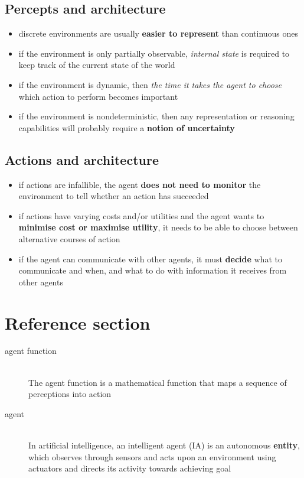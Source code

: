 \documentclass{article}
\begin{document}
\subsection{Percepts and architecture}

\begin{itemize}
  \item discrete environments are usually \textbf{easier to represent} than continuous ones 
  \item if the environment is only partially observable, \textit{internal state} is required to keep track of the current state of the world 
  \item if the environment is dynamic, then \textit{the time it takes the agent to choose} which action to perform becomes important 
  \item if the environment is nondeterministic, then any representation or reasoning capabilities will probably require a \textbf{notion of uncertainty}
\end{itemize}

\subsection{Actions and architecture}

\begin{itemize}
  \item if actions are infallible, the agent \textbf{does not need to monitor} the environment to tell whether an action has succeeded 
  \item if actions have varying costs and/or utilities and the agent wants to \textbf{minimise cost or maximise utility}, it needs to be able to choose between alternative courses of action 
  \item if the agent can communicate with other agents, it must \textbf{decide} what to communicate and when, and what to do with information it receives from other agents
\end{itemize}

\pagebreak
\section*{Reference section} \label{sec:reference}
\begin{description}
	\item[agent function] \hfill \\ The agent function is a mathematical function that maps a sequence of perceptions into action
	\item[agent] \hfill \\ In artificial intelligence, an intelligent agent (IA) is an autonomous \textbf{entity}, which observes through sensors and acts upon an environment using actuators and directs its activity towards achieving goal
\end{description}
\end{document}
